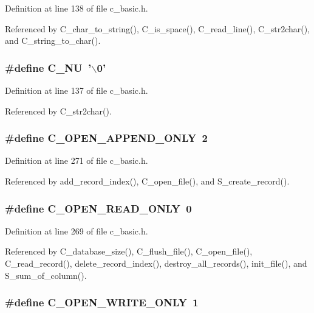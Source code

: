 Definition at line 138 of file c\_\-basic.h.

Referenced by C\_\-char\_\-to\_\-string(), C\_\-is\_\-space(), C\_\-read\_\-line(), C\_\-str2char(), and C\_\-string\_\-to\_\-char().
\subsubsection{\setlength{\rightskip}{0pt plus 5cm}\#define C\_\-NU~'$\backslash$0'}\label{c__basic_8h_eae7d1e3e45eef967ad514ca702c99bd}




Definition at line 137 of file c\_\-basic.h.

Referenced by C\_\-str2char().
\subsubsection{\setlength{\rightskip}{0pt plus 5cm}\#define C\_\-OPEN\_\-APPEND\_\-ONLY~2}\label{c__basic_8h_9c91c6e3a8fc6cd0a9a0b4d3cb1af9d0}




Definition at line 271 of file c\_\-basic.h.

Referenced by add\_\-record\_\-index(), C\_\-open\_\-file(), and S\_\-create\_\-record().
\subsubsection{\setlength{\rightskip}{0pt plus 5cm}\#define C\_\-OPEN\_\-READ\_\-ONLY~0}\label{c__basic_8h_f82668b20ce80dde648510d280d0577e}




Definition at line 269 of file c\_\-basic.h.

Referenced by C\_\-database\_\-size(), C\_\-flush\_\-file(), C\_\-open\_\-file(), C\_\-read\_\-record(), delete\_\-record\_\-index(), destroy\_\-all\_\-records(), init\_\-file(), and S\_\-sum\_\-of\_\-column().
\subsubsection{\setlength{\rightskip}{0pt plus 5cm}\#define C\_\-OPEN\_\-WRITE\_\-ONLY~1}\label{c__basic_8h_c5f4e455d9a79a9942da479deafb97f7}




